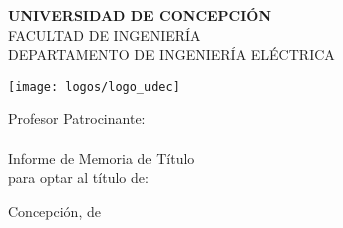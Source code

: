 \begin{titlepage}
\begingroup

\linespread{1}\selectfont
\setlength{\parskip}{0pt}
	
{ \vspace*{2 pc} }

\begin{center}
	\textbf{\LARGE UNIVERSIDAD DE CONCEPCIÓN} \\[0.4 pc]
	{\large FACULTAD DE INGENIERÍA} \\[0.4 pc]
	{ DEPARTAMENTO DE INGENIERÍA ELÉCTRICA} \\[0.4 pc]
\end{center}

\vspace{6 pc}

\noindent\begin{minipage}{0.35\textwidth}\hfill\end{minipage}
%
\begin{minipage}[t]{0.25\textwidth}
	\centering
	\texttt{[image: logos/logo\_udec]}
\end{minipage}
%
\hspace*{0.5cm}
%
\begin{minipage}{0.35\textwidth}
	Profesor Patrocinante: \\[0.4 pc] \textbf{\AdvisorNameA} \\
	\vskip 4.3cm
	Informe de Memoria de Título \\
	para optar al título de: \\[0.4 pc]
	\CTitle
\end{minipage}

\vspace{9 pc}

\begin{center}
	\textbf{\LARGE \MainTitle}
\end{center}
%
%
\vfill
Concepción,
\ifdefined\MyCustomDate
	\MyCustomDate
\else
	{\monthname} de \the\year
\fi
\hfill \AuthorName
%
%
\endgroup
\end{titlepage}
